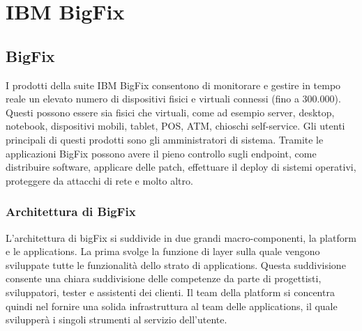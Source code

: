 \chapter{IBM BigFix}

\section{BigFix}
I prodotti della suite IBM BigFix consentono di monitorare e gestire in tempo reale un elevato numero di dispositivi fisici e virtuali connessi (fino a 300.000). Questi possono essere sia fisici che virtuali, come ad esempio server, desktop, notebook, dispositivi mobili, tablet, POS, ATM, chioschi self-service. Gli utenti principali di questi prodotti sono gli amministratori di sistema. Tramite le applicazioni BigFix possono avere il pieno controllo sugli endpoint, come distribuire software, applicare delle patch, effettuare il deploy di sistemi operativi, proteggere da attacchi di rete e molto altro.
\subsection{Architettura di BigFix}
L'architettura di bigFix si suddivide in due grandi macro-componenti, la platform e le applications. La prima svolge la funzione di layer sulla quale vengono sviluppate tutte le funzionalità dello strato di applications. Questa suddivisione consente una chiara suddivisione delle competenze da parte di progettisti, sviluppatori, tester e assistenti dei clienti. Il team della platform si concentra quindi nel fornire una solida infrastruttura al team delle applications, il quale svilupperà i singoli strumenti al servizio dell'utente.